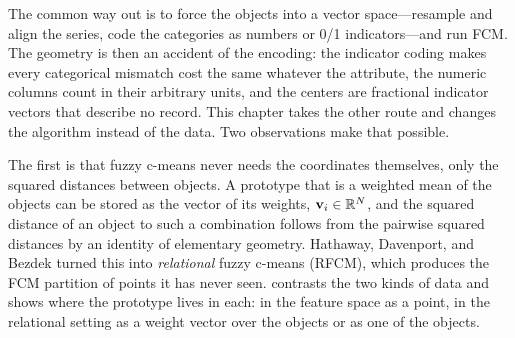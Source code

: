 The common way out is to force the objects into a vector space---resample and align the series, code the categories as numbers or 0/1 indicators---and run FCM. The geometry is then an accident of the encoding: the indicator coding makes every categorical mismatch cost the same whatever the attribute, the numeric columns count in their arbitrary units, and the centers are fractional indicator vectors that describe no record. This chapter takes the other route and changes the algorithm instead of the data. Two observations make that possible.

The first is that fuzzy c-means never needs the coordinates themselves, only the squared distances between objects. A prototype that is a weighted mean of the objects can be stored as the vector of its weights, $\mathbf{v}_i\in\mathbb{R}^N$, and the squared distance of an object to such a combination follows from the pairwise squared distances by an identity of elementary geometry. Hathaway, Davenport, and Bezdek \cite{hathaway:1989:rfcm} turned this into \emph{relational} fuzzy c-means (RFCM), which produces the FCM partition of points it has never seen.  contrasts the two kinds of data and shows where the prototype lives in each: in the feature space as a point, in the relational setting as a weight vector over the objects or as one of the objects.

